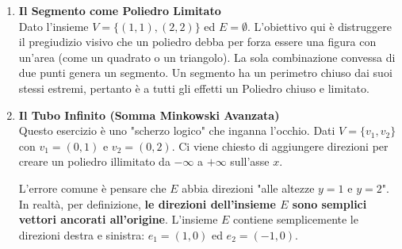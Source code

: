 \documentclass[12pt, a4paper]{article}
\begin{document}
\begin{enumerate}[label=\textbf{Esercizio \arabic*:}, itemsep=15pt, parsep=5pt, leftmargin=*]
\begin{figure}[H]
		\end{figure}
		
		\item \textbf{Il Segmento come Poliedro Limitato}\\
		Dato l'insieme $V=\{(1,1), (2,2)\}$ ed $E = \emptyset$. L'obiettivo qui è distruggere il pregiudizio visivo che un poliedro debba per forza essere una figura con un'area (come un quadrato o un triangolo). 
		La sola combinazione convessa di due punti genera un segmento. Un segmento ha un perimetro chiuso dai suoi stessi estremi, pertanto è a tutti gli effetti un Poliedro chiuso e limitato.
		
		\begin{figure}[H]
			\centering
		\end{figure}
		
		\item \textbf{Il Tubo Infinito (Somma Minkowski Avanzata)}\\
		Questo esercizio è uno "scherzo logico" che inganna l'occhio. Dati $V = \{v_1, v_2\}$ con $v_1=(0,1)$ e $v_2=(0,2)$. Ci viene chiesto di aggiungere direzioni per creare un poliedro illimitato da $-\infty$ a $+\infty$ sull'asse $x$. 
		
		L'errore comune è pensare che $E$ abbia direzioni "alle altezze $y=1$ e $y=2$". In realtà, per definizione, \textbf{le direzioni dell'insieme $E$ sono semplici vettori ancorati all'origine}. L'insieme $E$ contiene semplicemente le direzioni destra e sinistra: $e_1=(1,0)$ ed $e_2=(-1,0)$. 
		

\end{enumerate}
\end{document}
